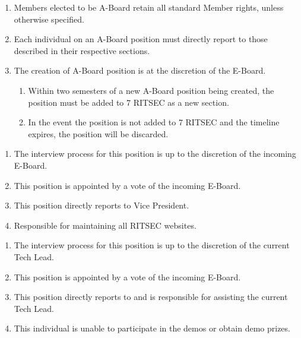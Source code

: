 

\begin{enumerate}
  \item Members elected to be A-Board retain all standard Member rights, unless otherwise specified. 
  \item Each individual on an A-Board position must directly report to those described in their respective sections.
  \item The creation of A-Board position is at the discretion of the E-Board.
  \begin{enumerate}
    \item Within two semesters of a new A-Board position being created, the position must be added to 7 RITSEC as a new section.
    \item In the event the position is not added to 7 RITSEC and the timeline expires, the position will be discarded.
  \end{enumerate}
\end{enumerate}


\begin{enumerate}
  \item The interview process for this position is up to the discretion of the incoming E-Board. 
  \item This position is appointed by a vote of the incoming E-Board.
  \item This position directly reports to Vice President. 
  \item Responsible for maintaining all RITSEC websites.
\end{enumerate}


\begin{enumerate}
  \item The interview process for this position is up to the discretion of the current Tech Lead.
  \item This position is appointed by a vote of the incoming E-Board.
  \item This position directly reports to and is responsible for assisting the current Tech Lead.
  \item This individual is unable to participate in the demos or obtain demo prizes.
\end{enumerate}

